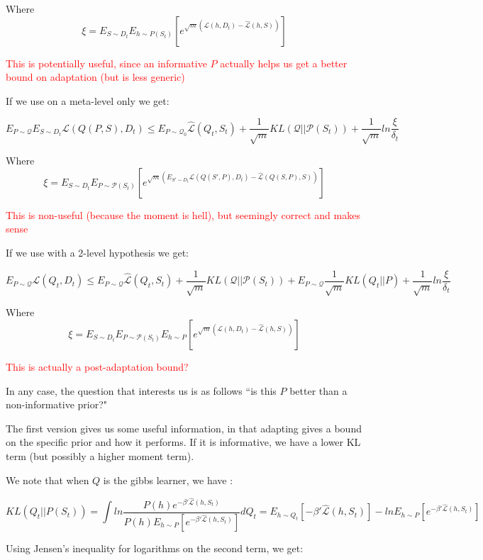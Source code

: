 \documentclass[letterpaper]{article}
\theoremstyle{definition}
\begin{document}
Where $$\xi=E_{S\sim D_t}E_{h\sim P(S_t)}\left [e^{\sqrt{m}(\mathcal{L}(h, D_t)-\hat{\mathcal{L}}(h, S))} \right ]$$

\textcolor{red}{This is potentially useful, since an informative $P$ actually helps us get a better bound on adaptation (but is less generic) }

If we use \cite{Rivasplata2020} on a meta-level only we get:

 $$E_{P\sim \mathcal{Q}}E_{S\sim D_t}\mathcal{L}(Q(P, S), D_t) \leq E_{P\sim \mathcal{Q}_0}\hat{\mathcal{L}}(Q_t, S_t) + \frac{1}{\sqrt{m}}KL(\mathcal{Q}|| \mathcal{P}(S_t)) + \frac{1}{\sqrt{m}}ln\frac{\xi}{\delta_t}$$
 
 Where $$\xi=E_{S\sim D_t}E_{P\sim \mathcal{P}(S_t)}\left [e^{\sqrt{m}(E_{S'\sim D_t}\mathcal{L}(Q(S', P), D_t)-\hat{\mathcal{L}}(Q(S, P), S))} \right ]$$
 
 \textcolor{red}{This is non-useful (because the moment is hell), but seemingly correct and makes sense}
 
 If we use \cite{Rivasplata2020} with a 2-level hypothesis we get:
 
 $$E_{P\sim \mathcal{Q}}\mathcal{L}(Q_t, D_t) \leq E_{P\sim \mathcal{Q}}\hat{\mathcal{L}}(Q_t, S_t) + \frac{1}{\sqrt{m}}KL(\mathcal{Q}|| \mathcal{P}(S_t)) + E_{P\sim \mathcal{Q}}\frac{1}{\sqrt{m}}KL(Q_t||P) + \frac{1}{\sqrt{m}}ln\frac{\xi}{\delta_t}$$
 
 Where $$\xi=E_{S\sim D_t}E_{P\sim \mathcal{P}(S_t)}E_{h\sim P}\left [e^{\sqrt{m}(\mathcal{L}(h, D_t)-\hat{\mathcal{L}}(h, S))} \right ]$$
 
 \textcolor{red}{This is actually a post-adaptation bound?}
 
 In any case, the question that interests us is as follows ``is this $P$ better than a non-informative prior?"
 
The first version gives us some useful information, in that adapting gives a bound on the specific prior and how it performs. If it is informative, we have a lower KL term (but possibly a higher moment term).

We note that when $Q$ is the gibbs learner, we have :

$$KL(Q_t||P(S_t))=\int ln \frac{P(h)e^{-\beta'\hat{\mathcal{L}}(h, S_t)}}{P(h)E_{h\sim P}\left [e^{-\beta'\hat{\mathcal{L}}(h, S_t)} \right ]} dQ_t=E_{h\sim Q_t}\left [-\beta'\hat{\mathcal{L}}(h, S_t) \right ]-lnE_{h\sim P}\left [e^{-\beta'\hat{\mathcal{L}}(h, S_t)} \right ]$$

Using Jensen's inequality for logarithms on the second term, we get:
\end{document}
